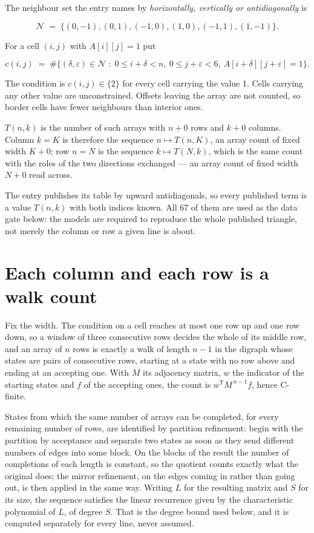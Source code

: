\documentclass[11pt]{article}
\theoremstyle{definition}
\begin{document}
The neighbour set the entry names by {\itshape horizontally, vertically or antidiagonally} is

\[\mathcal{N} \;=\; \{(0,-1), (0,1), (-1,0), (1,0), (-1,1), (1,-1)\}.\]

For a cell $(i,j)$ with $A[i][j] = 1$ put

\[c(i,j) \;=\; \#\bigl\{(\delta,\varepsilon)\in\mathcal{N} \;:\; 0\le i+\delta<n,\ 0\le j+\varepsilon<6,\ A[i+\delta][j+\varepsilon] = 1\bigr\}.\]

The condition is $c(i,j) \in \{2\}$ for every cell carrying the value 1. Cells carrying any other value are unconstrained. Offsets leaving the array are not counted, so border cells have fewer neighbours than interior ones.

$T(n,k)$ is the number of such arrays with $n + 0$ rows and $k + 0$ columns. Column $k = K$ is therefore the sequence $n \mapsto T(n,K)$, an array count of fixed width $K + 0$; row $n = N$ is the sequence $k \mapsto T(N,k)$, which is the same count with the roles of the two directions exchanged --- an array count of fixed width $N + 0$ read across.

The entry publishes its table by upward antidiagonals, so every published term is a value $T(n,k)$ with both indices known. All 67 of them are used as the data gate below: the models are required to reproduce the whole published triangle, not merely the column or row a given line is about.

\section{Each column and each row is a walk count}

Fix the width. The condition on a cell reaches at most one row up and one row down, so a window of three consecutive rows decides the whole of its middle row, and an array of $n$ rows is exactly a walk of length $n-1$ in the digraph whose states are pairs of consecutive rows, starting at a state with no row above and ending at an accepting one. With $M$ its adjacency matrix, $w$ the indicator of the starting states and $f$ of the accepting ones, the count is $w^{\mathsf T}M^{\,n-1}f$, hence C-finite.

States from which the same number of arrays can be completed, for every remaining number of rows, are identified by partition refinement: begin with the partition by acceptance and separate two states as soon as they send different numbers of edges into some block. On the blocks of the result the number of completions of each length is constant, so the quotient counts exactly what the original does; the mirror refinement, on the edges coming in rather than going out, is then applied in the same way. Writing $L$ for the resulting matrix and $S$ for its size, the sequence satisfies the linear recurrence given by the characteristic polynomial of $L$, of degree $S$. That is the degree bound used below, and it is computed separately for every line, never assumed.
\end{document}
